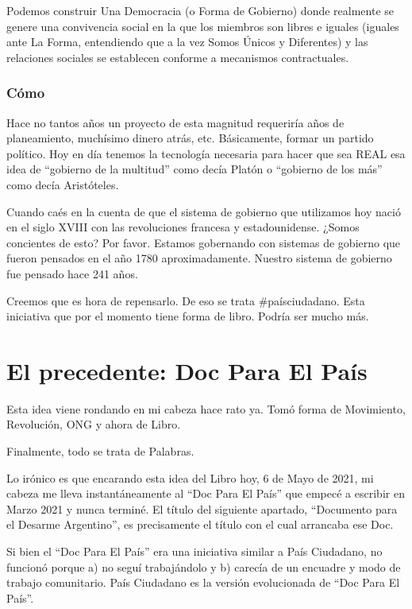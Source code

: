 \documentclass[
]{book}
\begin{document}
Podemos construir Una Democracia (o Forma de Gobierno) donde realmente se genere una convivencia social en la que los miembros son libres e iguales (iguales ante La Forma, entendiendo que a la vez Somos Únicos y Diferentes) y las relaciones sociales se establecen conforme a mecanismos contractuales.

\hypertarget{cuxf3mo}{%
\subsection{Cómo}\label{cuxf3mo}}

Hace no tantos años un proyecto de esta magnitud requeriría años de planeamiento, muchísimo dinero atrás, etc. Básicamente, formar un partido político. Hoy en día tenemos la tecnología necesaria para hacer que sea REAL esa idea de ``gobierno de la multitud'' como decía Platón o ``gobierno de los más'' como decía Aristóteles.

Cuando caés en la cuenta de que el sistema de gobierno que utilizamos hoy nació en el siglo XVIII con las revoluciones francesa y estadounidense. ¿Somos concientes de esto? Por favor. Estamos gobernando con sistemas de gobierno que fueron pensados en el año 1780 aproximadamente. Nuestro sistema de gobierno fue pensado hace 241 años.

Creemos que es hora de repensarlo. De eso se trata \#paísciudadano. Esta iniciativa que por el momento tiene forma de libro. Podría ser mucho más.

\hypertarget{el-precedente-doc-para-el-pauxeds}{%
\chapter{El precedente: Doc Para El País}\label{el-precedente-doc-para-el-pauxeds}}

Esta idea viene rondando en mi cabeza hace rato ya. Tomó forma de Movimiento, Revolución, ONG y ahora de Libro.

Finalmente, todo se trata de Palabras.

Lo irónico es que encarando esta idea del Libro hoy, 6 de Mayo de 2021, mi cabeza me lleva instantáneamente al ``Doc Para El País'' que empecé a escribir en Marzo 2021 y nunca terminé. El título del siguiente apartado, ``Documento para el Desarme Argentino'', es precisamente el título con el cual arrancaba ese Doc.

Si bien el ``Doc Para El País'' era una iniciativa similar a País Ciudadano, no funcionó porque a) no seguí trabajándolo y b) carecía de un encuadre y modo de trabajo comunitario. País Ciudadano es la versión evolucionada de ``Doc Para El País''.
\end{document}
